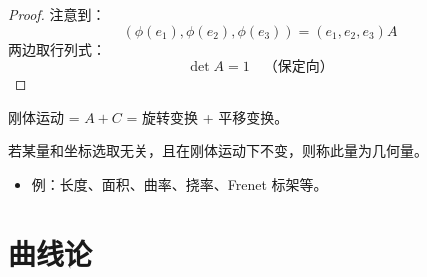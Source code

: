\documentclass[lang=cn,10pt,thmcnt=section]{elegantbook}
\begin{document}
\begin{proof}
    注意到：
    \begin{equation}
    (\phi(e_1), \phi(e_2), \phi(e_3)) = (e_1, e_2, e_3) A
    \end{equation}
    两边取行列式：
    \begin{equation}
    \det A = 1 \quad \text{（保定向）}
    \end{equation}
\end{proof}

\begin{theorem}[刚体运动分解]
    刚体运动 = $A + C$ = 旋转变换 + 平移变换。
\end{theorem}

\begin{definition}[几何量]
    若某量和坐标选取无关，且在刚体运动下不变，则称此量为几何量。
\end{definition}
    
\begin{itemize}
    \item 例：长度、面积、曲率、挠率、Frenet 标架等。
\end{itemize}

\chapter{曲线论}
\end{document}
